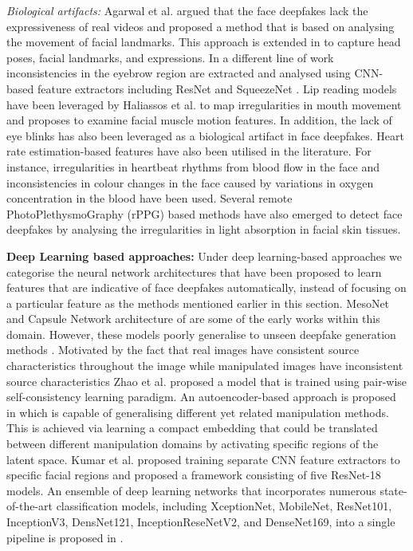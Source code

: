 \noindent\textit{Biological artifacts:} Agarwal et al. \cite{agarwal2019protecting} argued that the face deepfakes lack the expressiveness of real videos and proposed a method that is based on analysing the movement of facial landmarks. This approach is extended in \cite{agarwal2020detecting} to capture head poses, facial landmarks, and expressions. In a different line of work \cite{nguyen2020eyebrow} inconsistencies in the eyebrow region are extracted and analysed using CNN-based feature extractors including ResNet and SqueezeNet \cite{iandola2016squeezenet}. Lip reading models have been leveraged by Haliassos et al. \cite{haliassos2021lips} to map irregularities in mouth movement and \cite{liao2023famm} proposes to examine facial muscle motion features. In addition, the lack of eye blinks has also been leveraged as a biological artifact in face deepfakes. Heart rate estimation-based features have also been utilised in the literature. For instance, irregularities in heartbeat rhythms from blood flow in the face \cite{qi2020deeprhythm} and inconsistencies in colour changes in the face caused by variations in oxygen concentration in the blood \cite{fernandes2019predicting, hernandez2020deepfakeson} have been used. Several remote PhotoPlethysmoGraphy (rPPG) based methods \cite{ciftci2020fakecatcher, wu2024local} have also emerged to detect face deepfakes by analysing the irregularities in light absorption in facial skin tissues. 

\noindent\textbf{Deep Learning based approaches:} Under deep learning-based approaches we categorise the neural network architectures that have been proposed to learn features that are indicative of face deepfakes automatically, instead of focusing on a particular feature as the methods mentioned earlier in this section. MesoNet \cite{afchar2018mesonet} and Capsule Network architecture of \cite{nguyen2019capsule} are some of the early works within this domain. However, these models poorly generalise to unseen deepfake generation methods \cite{waseem2023deepfake}. Motivated by the fact that real images have consistent source characteristics throughout the image while manipulated images have inconsistent source characteristics Zhao et al.  \cite{zhao2021learning} proposed a model that is trained using pair-wise self-consistency learning paradigm. An autoencoder-based approach is proposed in \cite{cozzolino2018forensictransfer} which is capable of generalising different yet related manipulation methods. This is achieved via learning a compact embedding that could be translated between different manipulation domains by activating specific regions of the latent space. Kumar et al. \cite{kumar2020detecting} proposed training separate CNN feature extractors to specific facial regions and proposed a framework consisting of five ResNet-18 models. An ensemble of deep learning networks that incorporates numerous state-of-the-art classification models, including XceptionNet, MobileNet, ResNet101, InceptionV3, DensNet121, InceptionReseNetV2, and DenseNet169, into a single pipeline is proposed in \cite{rana2020deepfakestack}. 

